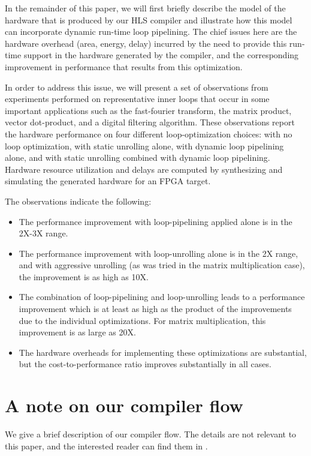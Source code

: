 \documentclass[conference]{IEEEtran}
\begin{document}
In the remainder of this paper, we will first briefly describe the model of
the hardware that is produced by our HLS compiler and illustrate how this model
can incorporate dynamic run-time loop pipelining.  The chief issues here are the
hardware overhead (area, energy, delay) incurred by the need to provide 
this run-time support in the hardware generated by the compiler, and
the corresponding improvement in performance that results from this optimization.

In order to address this issue, we will present a set of observations from
experiments performed on representative inner loops that occur in 
some important applications such as the fast-fourier transform, the
matrix product, vector dot-product, and a digital filtering algorithm.
These observations report the hardware performance on four different
loop-optimization choices: with no loop optimization, with static unrolling
alone, with dynamic loop pipelining alone, and with static unrolling combined with
dynamic loop pipelining.  Hardware resource utilization and delays are
computed by synthesizing and simulating the generated hardware for an FPGA target.

The observations indicate the following:
\begin{itemize}
\item The performance improvement with loop-pipelining applied alone is in the
2X-3X range.
\item The performance improvement with loop-unrolling alone is in the 
2X range, and with aggressive unrolling (as was tried in the matrix multiplication
case), the improvement is as high as 10X.
\item The combination of loop-pipelining and loop-unrolling leads
to a performance improvement which is at least as high as the
product of the improvements due to the individual optimizations.  
For matrix multiplication, this improvement is as large as 20X.
\item The hardware overheads for implementing these optimizations are substantial,
but the cost-to-performance ratio improves substantially in all cases.
\end{itemize}



\section{A note on our compiler flow}

We give a brief description of our compiler flow.  The
details are not relevant to this paper, and the interested
reader can find them in \cite{dsd2010}.
\end{document}
